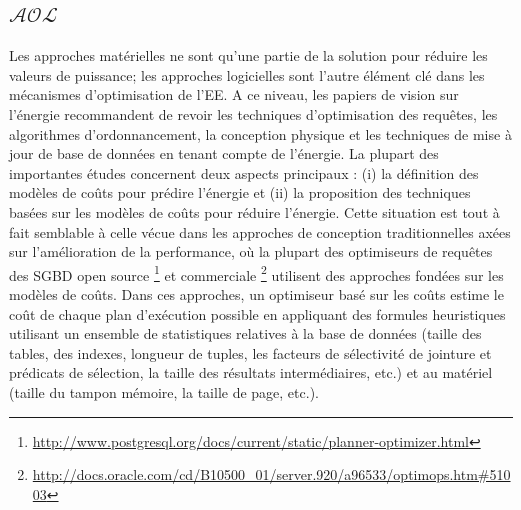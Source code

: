 \subsection{$\mathcal{AOL}$}
Les approches matérielles ne sont qu'une partie de la solution pour réduire les valeurs de puissance; les approches logicielles sont l'autre élément clé dans les mécanismes d'optimisation de l'EE. A ce niveau, les papiers de vision sur l'énergie \cite{Graefe08, Harizopoulos09} recommandent de revoir les techniques d'optimisation des requêtes, les algorithmes d’ordonnancement, la conception physique et les techniques de mise à jour de base de données en tenant compte de l'énergie. La plupart des importantes études concernent deux aspects principaux : (i) la définition des modèles de coûts pour prédire l'énergie et (ii) la proposition des techniques basées sur les modèles de coûts pour réduire l'énergie. Cette situation est tout à fait semblable à celle vécue dans les approches de conception traditionnelles axées sur l'amélioration de la performance, où la plupart des optimiseurs de requêtes des SGBD open source \footnote{\url{http://www.postgresql.org/docs/current/static/planner-optimizer.html}} et commerciale \footnote{\url{http://docs.oracle.com/cd/B10500_01/server.920/a96533/optimops.htm\#51003}} utilisent des approches fondées sur les modèles de coûts. Dans ces approches, un optimiseur basé sur les coûts estime le coût de chaque plan d'exécution possible en appliquant des formules heuristiques utilisant un ensemble de statistiques relatives à la base de données (taille des tables, des indexes, longueur de tuples, les facteurs de sélectivité de jointure et prédicats de sélection, la taille des résultats intermédiaires, etc.) et au matériel (taille du tampon mémoire, la taille de page, etc.).

